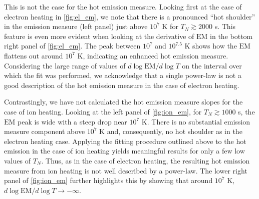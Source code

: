 \documentclass[apj]{emulateapj}
\begin{document}
	\par This is not the case for the hot emission measure. Looking first at the case of electron heating in \autoref{fig:el_em}, we note that there is a pronounced ``hot shoulder'' in the emission measure (left panel) just above $10^7$ K for $T_N\gtrsim2000$ s. This feature is even more evident when looking at the derivative of $\mathrm{EM}$ in the bottom right panel of \autoref{fig:el_em}. The peak between $10^7$ and $10^{7.5}$ K shows how the $\mathrm{EM}$ flattens out around $10^7$ K, indicating an enhanced hot emission measure. Considering the large range of values of $d\log{\mathrm{EM}}/d\log{T}$ on the interval over which the fit was performed, we acknowledge that a single power-law is not a good description of the hot emission measure in the case of electron heating.
	\par Contrastingly, we have not calculated the hot emission measure slopes for the case of ion heating. Looking at the left panel of \autoref{fig:ion_em}, for $T_N\gtrsim1000$ s, the $\mathrm{EM}$ peak is wide with a steep drop near $10^7$ K. There is no substantial emission measure component above $10^7$ K and, consequently, no hot shoulder as in the electron heating case. Applying the fitting procedure outlined above to the hot emission in the case of ion heating yields meaningful results for only a few low values of $T_N$. Thus, as in the case of electron heating, the resulting hot emission measure from ion heating is not well described by a power-law. The lower right panel of \autoref{fig:ion_em} further highlights this by showing that around $10^7$ K, $d\log{\mathrm{EM}}/d\log{T}\to-\infty$.
\end{document}
